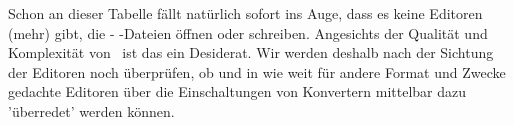 Schon an dieser Tabelle fällt natürlich sofort ins Auge, dass es keine Editoren
(mehr) gibt, die - -Dateien öffnen oder schreiben.
Angesichts der Qualität und Komplexität von \ ist das ein
Desiderat. Wir werden deshalb nach der Sichtung der Editoren noch überprüfen, ob
und in wie weit für andere Format und Zwecke gedachte Editoren über die
Einschaltungen von Konvertern mittelbar dazu 'überredet' werden können.

%
